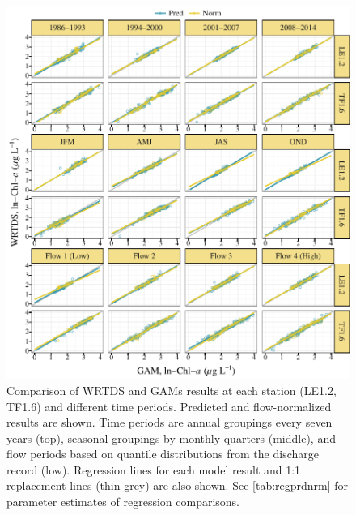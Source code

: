 \documentclass{svjour3}\usepackage[]{graphicx}\usepackage[]{color}
\makeatletter
\def\maxwidth{ %
  \ifdim\Gin@nat@width>\linewidth
    \linewidth
  \else
    \Gin@nat@width
  \fi
}
\makeatother
\begin{document}
\begin{figure}[!ht]

{\centering \includegraphics[width=\maxwidth]{figs/regprdnrm-1} 

}

\caption{Comparison of \ac{WRTDS} and \acp{GAM} results at each station (LE1.2, TF1.6) and different time periods.  Predicted and flow-normalized results are shown.  Time periods are annual groupings every seven years (top), seasonal groupings by monthly quarters (middle), and flow periods based on quantile distributions from the discharge record (low).  Regression lines for each model result and 1:1 replacement lines (thin grey) are also shown.  See \cref{tab:regprdnrm} for parameter estimates of regression comparisons.}\label{fig:regprdnrm}
\end{figure}
\end{document}
